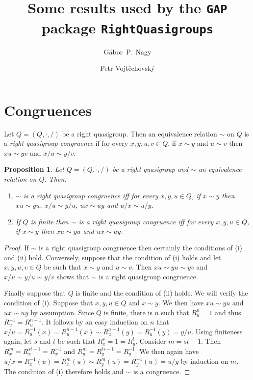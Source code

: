 \documentclass{amsart}
\theoremstyle{plain}
\newtheorem{proposition}[theorem]{Proposition}
\theoremstyle{definition}
\begin{document}
\title{Some results used by the \texttt{GAP} package \texttt{RightQuasigroups}}

\author{G\'abor~P.~Nagy}

\author{Petr Vojt\v{e}chovsk\'y}

\maketitle

\section{Congruences}

Let $Q=(Q,\cdot,/)$ be a right quasigroup. Then an equivalence relation $\sim$ on $Q$ is a \emph{right quasigroup congruence} if for every $x,y,u,v\in Q$, if $x\sim y$ and $u\sim v$ then $xu\sim yv$ and $x/u\sim y/v$.

\begin{proposition}\label{Pr:RightQuasigroupCongruence}
Let $Q=(Q,\cdot,/)$ be a right quasigroup and $\sim$ an equivalence relation on $Q$. Then:
\begin{enumerate}
\item[(i)] $\sim$ is a right quasigroup congruence iff for every $x,y,u\in Q$, if $x\sim y$ then $xu\sim yu$, $x/u\sim y/u$, $ux\sim uy$ and $u/x\sim u/y$.
\item[(ii)] If $Q$ is finite then $\sim$ is a right quasigroup congruence iff for every $x,y,u\in Q$, if $x\sim y$ then $xu\sim yu$ and $ux\sim uy$.
\end{enumerate}
\end{proposition}
\begin{proof}
If $\sim$ is a right quasigroup congruence then certainly the conditions of (i) and (ii) hold. Conversely, suppose that the condition of (i) holds and let $x,y,u,v\in Q$ be such that $x\sim y$ and $u\sim v$. Then $xu\sim yu\sim yv$ and $x/u\sim y/u\sim y/v$ shows that $\sim$ is a right quasigroup congruence.

Finally suppose that $Q$ is finite and the condition of (ii) holds. We will verify the condition of (i). Suppose that $x,y,u\in Q$ and $x\sim y$. We then have $xu\sim yu$ and $ux\sim uy$ by assumption. Since $Q$ is finite, there is $n$ such that $R_u^n=1$ and thus $R_u^{-1}=R_u^{n-1}$. It follows by an easy induction on $n$ that $x/u = R_u^{-1}(x) = R_u^{n-1}(x) \sim R_u^{n-1}(y) = R_u^{-1}(y) = y/u$. Using finiteness again, let $s$ and $t$ be such that $R_x^s=1=R_y^t$. Consider $m = st-1$. Then $R_x^m = R_x^{st-1} = R_x^{-1}$ and $R_y^m = R_y^{ts-1} = R_y^{-1}$. We then again have $u/x = R_x^{-1}(u) = R_x^m(u)\sim R_y^m(u) = R_y^{-1}(u) = u/y$ by induction on $m$. The condition of (i) therefore holds and $\sim$ is a congruence.
\end{proof}
\end{document}
